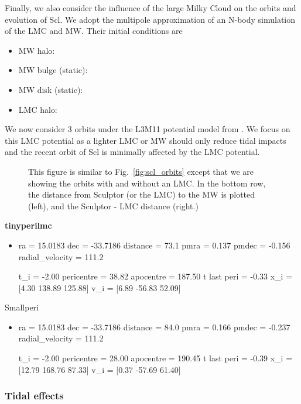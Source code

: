 Finally, we also consider the influence of the large Milky Cloud on the
orbits and evolution of Scl. We adopt the \citet{vasiliev2024} multipole
approximation of an N-body simulation of the LMC and MW. Their initial
conditions are

\begin{itemize}
\tightlist
\item
  MW halo:
\item
  MW bulge (static):
\item
  MW disk (static):
\item
  LMC halo:
\end{itemize}

We now consider 3 orbits under the L3M11 potential model from
\citet{vasiliev2024}. We focus on this LMC potential as a lighter LMC or
MW should only reduce tidal impacts and the recent orbit of Scl is
minimally affected by the LMC potential.

\begin{figure}
\centering
{}
\caption[Sculptor Orbits with LMC]{This figure is similar to
Fig.~\ref{fig:scl_orbits} except that we are showing the orbits with and
without an LMC. In the bottom row, the distance from Sculptor (or the
LMC) to the MW is plotted (left), and the Sculptor - LMC distance
(right.)}\label{fig:scl_lmc_orbit_effect}
\end{figure}

\textbf{tinyperilmc}

\begin{itemize}
\item
  ra = 15.0183 dec = -33.7186 distance = 73.1 pmra = 0.137 pmdec =
  -0.156 radial\_velocity = 111.2

  t\_i = -2.00 pericentre = 38.82 apocentre = 187.50 t last peri = -0.33
  x\_i = {[}4.30 138.89 125.88{]} v\_i = {[}6.89 -56.83 52.09{]}
\end{itemize}

Smallperi

\begin{itemize}
\item
  ra = 15.0183 dec = -33.7186 distance = 84.0 pmra = 0.166 pmdec =
  -0.237 radial\_velocity = 111.2

  t\_i = -2.00 pericentre = 28.00 apocentre = 190.45 t last peri = -0.39
  x\_i = {[}12.79 168.76 87.33{]} v\_i = {[}0.37 -57.69 61.40{]}
\end{itemize}

\subsubsection{Tidal effects}\label{tidal-effects-1}

